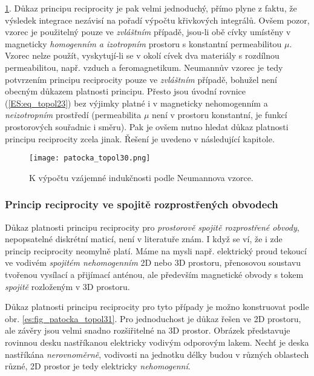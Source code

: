         \ref{es:fig_patocka_topol30}. Důkaz principu reciprocity je pak velmi jednoduchý, přímo 
        plyne z faktu, že výsledek integrace nezávisí na pořadí výpočtu křivkových integrálů. Ovšem 
        pozor, vzorec je použitelný pouze ve \emph{zvláštním} případě, jsou-li obě cívky umístěny v 
        magneticky \emph{homogenním a izotropním} prostoru s konstantní permeabilitou \(\mu\). 
        Vzorec nelze použít, vyskytují-li se v okolí cívek dva materiály s rozdílnou permeabilitou, 
        např. vzduch a feromagnetikum. Neumannův vzorec je tedy potvrzením principu reciprocity 
        pouze ve \emph{zvláštním} případě, bohužel není obecným důkazem platnosti principu. Přesto 
        jsou úvodní rovnice (\ref{ES:eq_topol23}) bez výjimky platné i v magneticky nehomogenním a 
        \emph{neizotropním} prostředí (permeabilita \(\mu\) není v prostoru konstantní, je funkcí 
        prostorových souřadnic i směru). Pak je ovšem nutno hledat důkaz platnosti principu 
        reciprocity zcela jinak. Řešení je uvedeno v následující kapitole.
        \begin{figure}[ht!]
          \centering  
          \texttt{[image: patocka\_topol30.png]}
          \caption{K výpočtu vzájemné indukčnosti podle Neumannova vzorce. \cite[s.~64]{Patocka4}} 
          \label{es:fig_patocka_topol30}
        \end{figure} 
     
      \subsubsection{Princip reciprocity ve spojitě rozprostřených obvodech}
        Důkaz platnosti principu reciprocity pro \emph{prostorově spojitě rozprostřené obvody},
        nepopsatelné diskrétní maticí, není v literatuře znám. I když se ví, že i zde princip
        reciprocity neomylně platí. Máme na mysli např. elektrický proud tekoucí ve vodivém
        \emph{spojitém nehomogenním} 2D nebo 3D prostoru, přenosovou soustavu tvořenou vysílací a
        přijímací anténou, ale především magnetické obvody s tokem \emph{spojitě} rozloženým v 3D
        prostoru.
        
        Důkaz platnosti principu reciprocity pro tyto případy je možno konstruovat podle obr.
        \ref{es:fig_patocka_topol31}. Pro jednoduchost je důkaz řešen ve 2D prostoru, ale závěry
        jsou velmi snadno rozšiřitelné na 3D prostor. Obrázek představuje rovinnou desku nastříkanou
        elektricky vodivým odporovým lakem. Nechť je deska nastříkána \emph{nerovnoměrně}, vodivosti
        na jednotku délky budou v různých oblastech různé, 2D prostor je tedy elektricky
        \emph{nehomogenní}.
        
